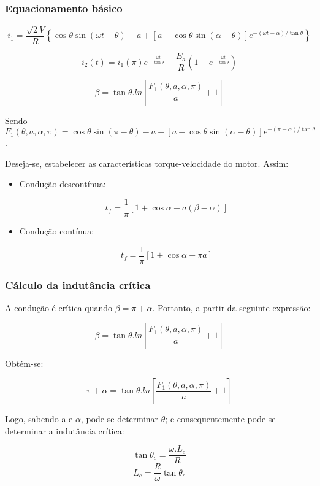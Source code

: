 \subsubsection{Equacionamento básico}

\[i_{1} = \frac{\sqrt{2}V}{R}\left\{\cos{\theta}\sin\left(\omega{t} - \theta\right) - a + \left[a - \cos{\theta}\sin{\left(\alpha - \theta\right)}\right]e^{-\left(\omega{t} - \alpha\right)/\tan{\theta}}\right\}\]

\[i_{2}(t) = i_{1}(\pi)e^{-\frac{\omega{t}}{\tan{\theta}}} - \frac{E_{a}}{R}\left(1 - e^{-\frac{\omega{t}}{\tan{\theta}}}\right)\]

\[\beta = \tan{\theta}.ln\left[\frac{F_{1}(\theta,a,\alpha,\pi)}{a} + 1\right]\]

Sendo $F_{1}(\theta,a,\alpha,\pi) = \cos{\theta}\sin\left(\pi - \theta\right) - a + \left[a - \cos{\theta}\sin{\left(\alpha - \theta\right)}\right]e^{-\left(\pi - \alpha\right)/\tan{\theta}} $.

Deseja-se, estabelecer as características torque-velocidade do motor. Assim:

\begin{itemize}
    \item Condução descontínua:
    
	\[t_{f} = \frac{1}{\pi}\left[1 + \cos{\alpha} - a(\beta - \alpha)\right]\]
    
    \item Condução contínua:
    
	\[t_{f} = \frac{1}{\pi}\left[1 + \cos{\alpha} - \pi{a}\right]\]
    
    
\end{itemize}

\subsubsection{Cálculo da indutância crítica}

A condução é crítica quando $\beta = \pi + \alpha$. Portanto, a partir da seguinte expressão:

\[\beta = \tan{\theta}.ln\left[\frac{F_{1}(\theta,a,\alpha,\pi)}{a} + 1\right]\]

Obtém-se:

\[\pi + \alpha = \tan{\theta}.ln\left[\frac{F_{1}(\theta,a,\alpha,\pi)}{a} + 1\right]\]

Logo, sabendo a e $\alpha$, pode-se determinar $\theta$; e consequentemente pode-se determinar a indutância crítica:

\[\tan{\theta_{c}} = \frac{\omega.L_{c}}{R}\]
\[L_{c} = \frac{R}{\omega}\tan{\theta_{c}}\]

